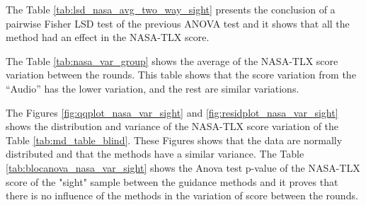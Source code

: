 The Table \ref{tab:lsd_nasa_avg_two_way_sight} presents the conclusion of a pairwise Fisher LSD test of the previous ANOVA test and it shows that all the method had an effect in the NASA-TLX score.



The Table \ref{tab:nasa_var_group} shows the average of the NASA-TLX score variation between the rounds. This table shows that the score variation from the “Audio” has the lower variation, and the rest are similar variations.



The Figures \ref{fig:qqplot_nasa_var_sight} and \ref{fig:residplot_nasa_var_sight} shows the distribution and variance of the NASA-TLX score variation of the Table \ref{tab:md_table_blind}. These Figures shows that the data are normally distributed and that the methods have a similar variance.
The Table \ref{tab:blocanova_nasa_var_sight} shows the Anova test p-value of the NASA-TLX score of the "sight" sample between the guidance methods and it proves that there is no influence of the methods in the variation of score between the rounds. 




